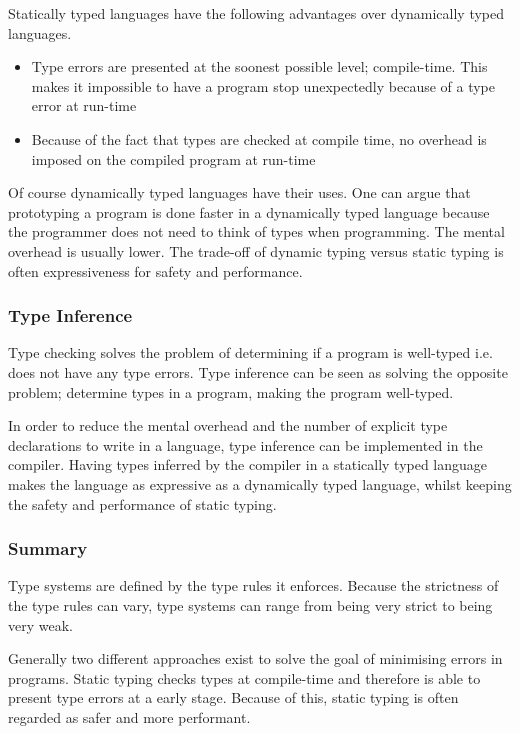 Statically typed languages have the following advantages over dynamically typed languages.

\begin{itemize}
  \item Type errors are presented at the soonest possible level; compile-time. This makes it impossible to have a program stop unexpectedly because of a type error at run-time
  \item Because of the fact that types are checked at compile time, no overhead is imposed on the compiled program at run-time
\end{itemize}

Of course dynamically typed languages have their uses. One can argue that prototyping a program is done faster in a dynamically typed language because the programmer does not need to think of types when programming. The mental overhead is usually lower. The trade-off of dynamic typing versus static typing is often expressiveness for safety and performance.

\subsubsection{Type Inference}
Type checking solves the problem of determining if a program is well-typed i.e. does not have any type errors. Type inference can be seen as solving the opposite problem; determine types in a program, making the program well-typed.

In order to reduce the mental overhead and the number of explicit type declarations to write in a language, type inference can be implemented in the compiler. Having types inferred by the compiler in a statically typed language makes the language as expressive as a dynamically typed language, whilst keeping the safety and performance of static typing.

\subsubsection{Summary}
Type systems are defined by the type rules it enforces. Because the strictness of the type rules can vary, type systems can range from being very strict to being very weak.

Generally two different approaches exist to solve the goal of minimising errors in programs. Static typing checks types at compile-time and therefore is able to present type errors at a early stage. Because of this, static typing is often regarded as safer and more performant.

